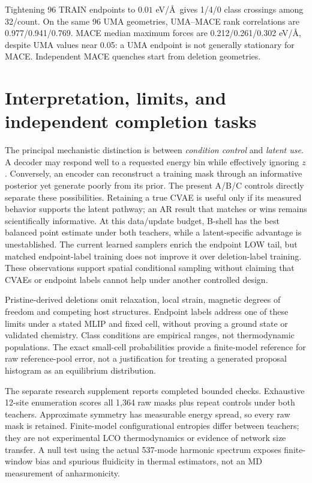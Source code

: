 \documentclass[10pt]{article}
\begin{document}
Tightening 96 TRAIN endpoints to $0.01$ eV/\AA\ gives 1/4/0 class crossings
among 32/count. On the same 96 UMA geometries, UMA--MACE rank correlations are
0.977/0.941/0.769. MACE median maximum forces are 0.212/0.261/0.302 eV/\AA,
despite UMA values near 0.05: a UMA endpoint is not generally stationary for
MACE. Independent MACE quenches start from deletion geometries.
\newpage

\section{Interpretation, limits, and independent completion tasks}
The principal mechanistic distinction is between \emph{condition control} and
\emph{latent use}. A decoder may respond well to a requested energy bin while
effectively ignoring $z$. Conversely, an encoder can reconstruct a training
mask through an informative posterior yet generate poorly from its prior.
The present A/B/C controls directly separate these possibilities. Retaining a
true CVAE is useful only if its measured behavior supports the latent pathway;
an AR result that matches or wins remains scientifically informative.
At this data/update budget, B-shell has the best balanced point estimate under
both teachers, while a latent-specific advantage is unestablished. The current
learned samplers enrich the endpoint LOW tail, but matched endpoint-label
training does not improve it over deletion-label training. These observations
support spatial conditional sampling without claiming that CVAEs or endpoint
labels cannot help under another controlled design.

Pristine-derived deletions omit relaxation, local strain, magnetic degrees of
freedom and competing host structures. Endpoint labels address one of these
limits under a stated MLIP and fixed cell, without proving a ground state or
validated chemistry. Class conditions are empirical ranges, not thermodynamic
populations. The exact small-cell probabilities provide a finite-model reference
for raw reference-pool error, not a justification for treating a generated
proposal histogram as an equilibrium distribution.

The separate research supplement reports completed bounded checks. Exhaustive
12-site enumeration scores all 1,364 raw masks plus repeat controls under both
teachers. Approximate symmetry has measurable energy spread, so every raw mask
is retained. Finite-model configurational entropies differ between teachers;
they are not experimental LCO thermodynamics or evidence of network size
transfer. A null test using the actual 537-mode harmonic spectrum exposes
finite-window bias and spurious fluidicity in thermal estimators, not an MD
measurement of anharmonicity.
\end{document}
